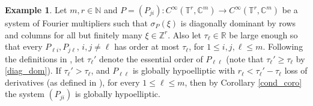 \documentclass[11pt]{amsart}
\numberwithin{theorem}{section}
\numberwithin{equation}{section}
\theoremstyle{definition}
\newtheorem{example}{Example}
\numberwithin{example}{section}
\theoremstyle{definition}
\theoremstyle{definition}
\newcommand{\R}{\mathbb{R}}
\newcommand{\Z}{\mathbb{Z}}
\newcommand{\N}{\mathbb{N}}
\newcommand{\T}{\mathbb{T}}
\newcommand{\C}{\mathbb{C}}
\begin{document}
\begin{example}
     Let $m,r\in\N$ and $P=(P_{ji}):C^\infty(\T^r,\mathbb{C}^m)\to C^\infty(\T^r,\mathbb{C}^m)$ be a system of Fourier multipliers such that $\sigma_P(\xi)$ is diagonally dominant by rows and columns for all but finitely many $\xi\in\Z^r$. Also let $\tau_\ell\in\R$ be large enough so that every $P_{\ell i},P_{j \ell}$, $i,j\neq \ell$ has order at most $\tau_\ell$, for $1\leq i,j,\ell\leq m$. Following the definitions in \cite{kkfinite}, let $\tau_\ell'$ denote the essential order of $P_{\ell\ell}$ (note that $\tau_\ell'\geq \tau_\ell$ by \eqref{diag_dom}). If $\tau_\ell'>\tau_\ell$, and $P_{\ell\ell}$ is globally hypoelliptic with $r_\ell<\tau_\ell'-\tau_\ell$ loss of derivatives (as defined in  \cite{kkfinite}), for every $1\leq \ell\leq m$, then by Corollary \eqref{cond_coro} the system $(P_{ji})$ is globally hypoelliptic. 
\end{example}





\end{document}
